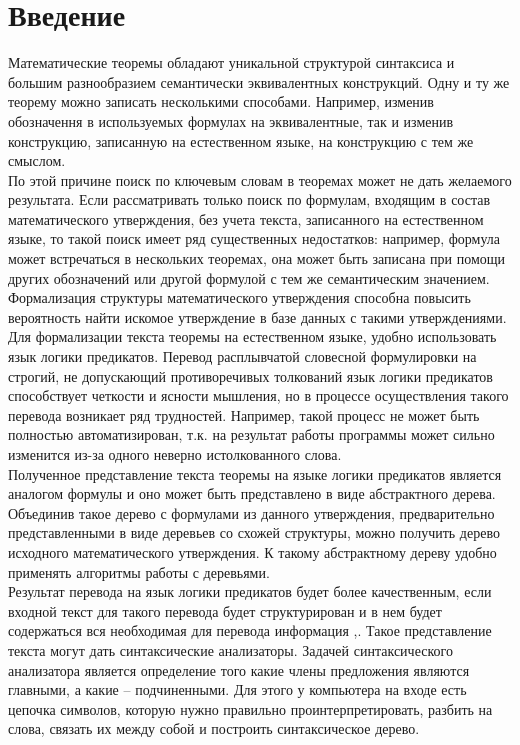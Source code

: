 \documentclass[12pt]{article}
\begin{document}
\section*{Введение}
Математические теоремы обладают уникальной структурой синтаксиса и большим разнообразием семантически эквивалентных конструкций. Одну и ту же теорему можно записать несколькими способами. Например, изменив обозначення  в используемых формулах на эквивалентные, так и изменив конструкцию, записанную на естественном языке, на конструкцию с тем же смыслом.\\

По этой причине поиск по ключевым словам в теоремах может не дать желаемого результата. Если рассматривать только поиск по формулам, входящим в состав математического утверждения, без учета текста, записанного на естественном языке, то такой поиск имеет ряд существенных недостатков: например, формула может встречаться в нескольких теоремах, она может быть записана при помощи других обозначений или другой формулой с тем же семантическим значением. \\

Формализация структуры математического утверждения способна повысить вероятность найти искомое утверждение в базе данных с такими утверждениями. Для формализации текста теоремы на естественном языке, удобно использовать язык логики предикатов. Перевод расплывчатой словесной формулировки на строгий, не допускающий противоречивых толкований язык логики предикатов способствует четкости и ясности мышления, но в процессе осуществления такого перевода возникает ряд трудностей. Например, такой процесс не может быть полностью автоматизирован, т.к. на результат работы программы может сильно изменится из-за одного неверно истолкованного слова. \\

Полученное представление текста теоремы на языке логики предикатов является аналогом формулы и оно может быть представлено в виде абстрактного дерева. Объединив такое дерево с формулами из данного утверждения, предварительно представленными в виде деревьев со схожей структуры,  можно получить дерево исходного математического утверждения. К такому абстрактному дереву удобно применять алгоритмы работы с деревьями.\\

Результат перевода на язык логики предикатов будет более качественным, если входной текст для такого перевода будет структурирован и в нем будет содержаться вся необходимая для перевода информация \cite{author11},\cite{author12}. Такое представление текста могут дать синтаксические анализаторы. Задачей синтаксического анализатора является определение того какие члены предложения являются главными, а какие – подчиненными. Для этого у компьютера на входе есть цепочка символов, которую нужно правильно проинтерпретировать, разбить на слова, связать их между собой и построить синтаксическое дерево. \\
\end{document}
